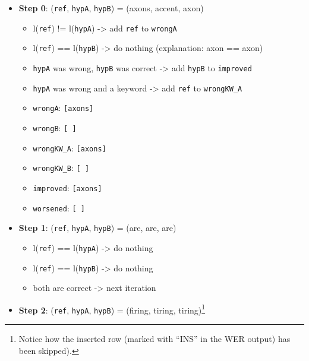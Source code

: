 \documentclass[]{article}
\providecommand{\tightlist}{%
  \setlength{\itemsep}{0pt}\setlength{\parskip}{0pt}}
\begin{document}
\begin{itemize}
\tightlist
\item
  \textbf{Step 0}: (\texttt{ref}, \texttt{hypA}, \texttt{hypB}) =
  (axons, accent, axon)

  \begin{itemize}
  \tightlist
  \item
    l(\texttt{ref}) != l(\texttt{hypA}) -\textgreater{} add \texttt{ref}
    to \texttt{wrongA}
  \item
    l(\texttt{ref}) == l(\texttt{hypB}) -\textgreater{} do nothing
    (explanation: axon == axon)
  \item
    \texttt{hypA} was wrong, \texttt{hypB} was correct -\textgreater{}
    add \texttt{hypB} to \texttt{improved}
  \item
    \texttt{hypA} was wrong and a keyword -\textgreater{} add
    \texttt{ref} to \texttt{wrongKW\_A}
  \item
    \texttt{wrongA}: \texttt{{[}axons{]}}
  \item
    \texttt{wrongB}: \texttt{{[}\ {]}}
  \item
    \texttt{wrongKW\_A}: \texttt{{[}axons{]}}
  \item
    \texttt{wrongKW\_B}: \texttt{{[}\ {]}}
  \item
    \texttt{improved}: \texttt{{[}axons{]}}
  \item
    \texttt{worsened}: \texttt{{[}\ {]}}
  \end{itemize}
\item
  \textbf{Step 1}: (\texttt{ref}, \texttt{hypA}, \texttt{hypB}) = (are,
  are, are)

  \begin{itemize}
  \tightlist
  \item
    l(\texttt{ref}) == l(\texttt{hypA}) -\textgreater{} do nothing
  \item
    l(\texttt{ref}) == l(\texttt{hypB}) -\textgreater{} do nothing
  \item
    both are correct -\textgreater{} next iteration
  \end{itemize}
\item
  \textbf{Step 2}: (\texttt{ref}, \texttt{hypA}, \texttt{hypB}) =
  (firing, tiring, tiring)\footnote{Notice how the inserted row (marked
    with ``INS'' in the WER output) has been skipped).}


\end{itemize}
\end{document}
